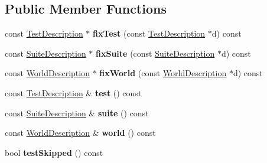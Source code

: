 \subsection*{Public Member Functions}
\begin{DoxyCompactItemize}
\item 
\hypertarget{classCxxTest_1_1TestTracker_a02f9382a8d08d508eff303c0174ba7ff}{const \hyperlink{classCxxTest_1_1TestDescription}{Test\-Description} $\ast$ {\bfseries fix\-Test} (const \hyperlink{classCxxTest_1_1TestDescription}{Test\-Description} $\ast$d) const }\label{classCxxTest_1_1TestTracker_a02f9382a8d08d508eff303c0174ba7ff}

\item 
\hypertarget{classCxxTest_1_1TestTracker_a2709b62654d0cdb173c7edc7e1e86882}{const \hyperlink{classCxxTest_1_1SuiteDescription}{Suite\-Description} $\ast$ {\bfseries fix\-Suite} (const \hyperlink{classCxxTest_1_1SuiteDescription}{Suite\-Description} $\ast$d) const }\label{classCxxTest_1_1TestTracker_a2709b62654d0cdb173c7edc7e1e86882}

\item 
\hypertarget{classCxxTest_1_1TestTracker_ae8e907563f59629cf89bfc8d475f0670}{const \hyperlink{classCxxTest_1_1WorldDescription}{World\-Description} $\ast$ {\bfseries fix\-World} (const \hyperlink{classCxxTest_1_1WorldDescription}{World\-Description} $\ast$d) const }\label{classCxxTest_1_1TestTracker_ae8e907563f59629cf89bfc8d475f0670}

\item 
\hypertarget{classCxxTest_1_1TestTracker_a8edec34ac735ec377b1b981e957e05ec}{const \hyperlink{classCxxTest_1_1TestDescription}{Test\-Description} \& {\bfseries test} () const }\label{classCxxTest_1_1TestTracker_a8edec34ac735ec377b1b981e957e05ec}

\item 
\hypertarget{classCxxTest_1_1TestTracker_ab09d3ae879aeee14dcf1970e4680d120}{const \hyperlink{classCxxTest_1_1SuiteDescription}{Suite\-Description} \& {\bfseries suite} () const }\label{classCxxTest_1_1TestTracker_ab09d3ae879aeee14dcf1970e4680d120}

\item 
\hypertarget{classCxxTest_1_1TestTracker_ad89ddc3c6b70f85fc093582024edba29}{const \hyperlink{classCxxTest_1_1WorldDescription}{World\-Description} \& {\bfseries world} () const }\label{classCxxTest_1_1TestTracker_ad89ddc3c6b70f85fc093582024edba29}

\item 
\hypertarget{classCxxTest_1_1TestTracker_a336b5e8fb96c9efc8691c24a9a218981}{bool {\bfseries test\-Skipped} () const }\label{classCxxTest_1_1TestTracker_a336b5e8fb96c9efc8691c24a9a218981}


\end{DoxyCompactItemize}

